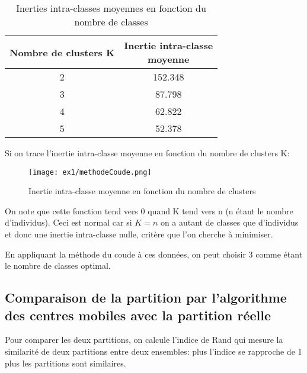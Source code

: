 \documentclass{article}
\begin{document}
\begin{multicols}{2}
\begin{table}[H]
    \begin{center}
        \centering
        \captionsetup{justification=centering}
        \caption{\label{tab:avgInerties}Inerties intra-classes moyennes en fonction du nombre de classes}
        \begin{tabular}{|c|c|}
            \hline
            Nombre de clusters K & \pbox{20cm}{Inertie intra-classe \\ moyenne} \\
            \hline
            2 & 152.348 \\
            3 & 87.798 \\
            4 & 62.822 \\
            5 & 52.378 \\
            \hline
        \end{tabular}
    \end{center}
\end{table}

Si on trace l'inertie intra-classe moyenne en fonction du nombre de clusters K:

\begin{figure}[H]
    \begin{center}
        \texttt{[image: ex1/methodeCoude.png]}
    \centering
    \captionsetup{justification=centering}
    \caption{\label{fig:coude}Inertie intra-classe moyenne en fonction du nombre de clusters}
\end{center}
\end{figure}

On note que cette fonction tend vers 0 quand K tend vers n (n étant le nombre
d'individus). Ceci est normal car si $K = n$ on a autant de classes que
d'individus et donc une inertie intra-classe nulle, critère que l'on cherche à
minimiser.

En appliquant la méthode du coude à ces données, on peut choisir 3 comme étant
le nombre de classes optimal.

\subsection{Comparaison de la partition par l'algorithme des centres mobiles avec la partition réelle}\label{subsec:comparaison}

Pour comparer les deux partitions, on calcule l'indice de Rand qui mesure la
similarité de deux partitions entre deux ensembles: plus l'indice se rapproche
de 1 plus les partitions sont similaires.


\end{multicols}
\end{document}
